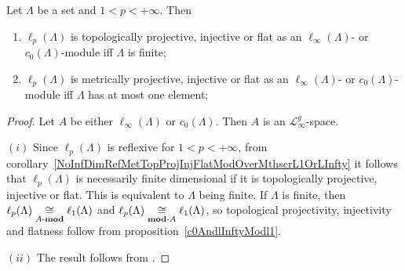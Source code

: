 \begin{proposition}\label{c0AndlInftyModlp} Let $\Lambda$ be a set and
$1<p<+\infty$. Then 

\begin{enumerate}[label = (\roman*)]
    \item $\ell_p(\Lambda)$ is topologically projective,
    injective or flat as an $\ell_\infty(\Lambda)$- or $c_0(\Lambda)$-module iff
    $\Lambda$ is finite;

    \item $\ell_p(\Lambda)$ is metrically projective,
    injective or flat as an $\ell_\infty(\Lambda)$- or $c_0(\Lambda)$-module iff
    $\Lambda$ has at most one element;
\end{enumerate}
\end{proposition}
\begin{proof} Let $A$ be either $\ell_\infty(\Lambda)$ 
or $c_0(\Lambda)$. Then $A$ is an $\mathscr{L}_\infty^g$-space.

$(i)$ Since $\ell_p(\Lambda)$ is reflexive for $1<p<+\infty$, from 
corollary~\ref{NoInfDimRefMetTopProjInjFlatModOverMthscrL1OrLInfty} it follows 
that $\ell_p(\Lambda)$ is necessarily finite dimensional if it is 
topologically projective, injective or flat. This is equivalent to $\Lambda$
being finite. If $\Lambda$ is finite, then
$\ell_p(\Lambda)\mathrel{\mathop{\cong}\limits_{A\text{-}\mathbf{mod}}}\ell_1(\Lambda)$ and
$\ell_p(\Lambda)\mathrel{\mathop{\cong}\limits_{\mathbf{mod}\text{-}A}}\ell_1(\Lambda)$, so topological
projectivity, injectivity and flatness follow from
proposition~\ref{c0AndlInftyModl1}.

$(ii)$ The result follows from \cite[theorem 4.5]{NemMetProjInjFlatModLp}.
\end{proof}

